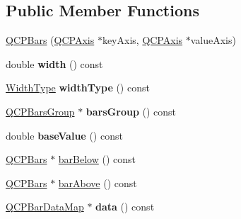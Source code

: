\subsection*{Public Member Functions}
\begin{DoxyCompactItemize}
\item 
\hyperlink{classQCPBars_a64006999ad9dff308f40df41cef176ad}{Q\+C\+P\+Bars} (\hyperlink{classQCPAxis}{Q\+C\+P\+Axis} $\ast$key\+Axis, \hyperlink{classQCPAxis}{Q\+C\+P\+Axis} $\ast$value\+Axis)
\item 
\hypertarget{classQCPBars_a42798c38abd5f5db22bd45d77f429625}{}double {\bfseries width} () const \label{classQCPBars_a42798c38abd5f5db22bd45d77f429625}

\item 
\hypertarget{classQCPBars_a8606651ada5804075f6affd04c88dd05}{}\hyperlink{classQCPBars_a65dbbf1ab41cbe993d71521096ed4649}{Width\+Type} {\bfseries width\+Type} () const \label{classQCPBars_a8606651ada5804075f6affd04c88dd05}

\item 
\hypertarget{classQCPBars_a6d6b2b17619a0ba9c7a88bb2b90fc178}{}\hyperlink{classQCPBarsGroup}{Q\+C\+P\+Bars\+Group} $\ast$ {\bfseries bars\+Group} () const \label{classQCPBars_a6d6b2b17619a0ba9c7a88bb2b90fc178}

\item 
\hypertarget{classQCPBars_a3c8686a74396883fd1da87b2e325b043}{}double {\bfseries base\+Value} () const \label{classQCPBars_a3c8686a74396883fd1da87b2e325b043}

\item 
\hyperlink{classQCPBars}{Q\+C\+P\+Bars} $\ast$ \hyperlink{classQCPBars_a2c46a686cbad95f180ca3c2e88263961}{bar\+Below} () const 
\item 
\hyperlink{classQCPBars}{Q\+C\+P\+Bars} $\ast$ \hyperlink{classQCPBars_a9ca48a6577586825d85bdc1fbf410803}{bar\+Above} () const 
\item 
\hypertarget{classQCPBars_ac05c21de37f677545d06fd852ef8a743}{}\hyperlink{qcustomplot_8h_aa846c77472cae93def9f1609d0c57191}{Q\+C\+P\+Bar\+Data\+Map} $\ast$ {\bfseries data} () const \label{classQCPBars_ac05c21de37f677545d06fd852ef8a743}


\end{DoxyCompactItemize}
